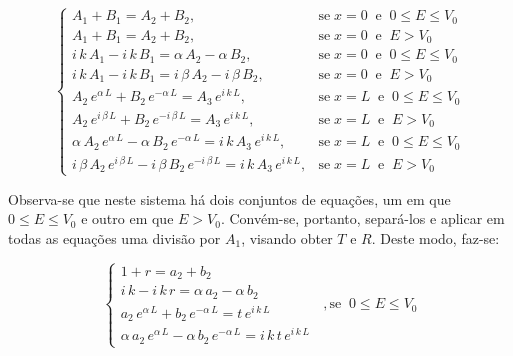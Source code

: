 \begin{equation}
	\begin{cases}
		A_1 + B_1 = A_2 + B_2 ,                                          &
		\mbox{se}\; x=0 \;\; \mbox{e} \;\; 0 \le E \le V_0                 \\

		A_1 + B_1 = A_2 + B_2 ,                                          &
		\mbox{se}\; x=0 \;\; \mbox{e} \;\; E > V_0                         \\

		i\,k\,A_1 - i\,k\,B_1 = \alpha\,A_2 - \alpha\,B_2 ,              &
		\mbox{se}\; x=0 \;\; \mbox{e} \;\; 0 \le E \le V_0                 \\

		i\,k\,A_1 - i\,k\,B_1 = i\,\beta\,A_2 - i\,\beta\,B_2 ,          &
		\mbox{se}\; x=0 \;\; \mbox{e} \;\; E > V_0                         \\

		A_2\,e^{\alpha\,L} + B_2\,e^{-\alpha\,L} = A_3\,e^{i\,k\,L} ,    &
		\mbox{se}\; x=L \;\; \mbox{e} \;\; 0 \le E \le V_0                 \\

		A_2\,e^{i\,\beta\,L} + B_2\,e^{-i\,\beta\,L} = A_3\,e^{i\,k\,L}, &
		\mbox{se}\; x=L \;\; \mbox{e} \;\; E > V_0                         \\

		\alpha\,A_2\,e^{\alpha\,L} - \alpha\,B_2\,e^{-\alpha\,L} =
		i\,k\,A_3\,e^{i\,k\,L} ,                                         &
		\mbox{se}\; x=L \;\; \mbox{e} \;\; 0 \le E \le V_0                 \\

		i\,\beta\,A_2\,e^{i\,\beta\,L} - i\,\beta\,B_2\,e^{-i\,\beta\,L} =
		i\,k\,A_3\,e^{i\,k\,L},                                          &
		\mbox{se}\; x=L \;\; \mbox{e} \;\; E > V_0
	\end{cases}
\end{equation}

\noindent Observa-se que neste sistema há dois conjuntos de equações, um em que
$0 \le E \le V_0$ e outro em que $E>V_0$. Convém-se, portanto, separá-los
e aplicar em todas as equações uma divisão por $A_1$, visando obter $T$ e $R$.
Deste modo, faz-se:

\begin{equation}
	\begin{cases}
		1 + r = a_2 + b_2                                         \\
		i\,k - i\,k\,r = \alpha\,a_2 - \alpha\,b_2                \\
		a_2\,e^{\alpha\,L} + b_2\,e^{-\alpha\,L} = t\,e^{i\,k\,L} \\
		\alpha\,a_2\,e^{\alpha\,L} - \alpha\,b_2\,e^{-\alpha\,L} =
		i\,k\,t\,e^{i\,k\,L}
	\end{cases}\;\;, \mbox{se}\;\;0 \le E \le V_0
\end{equation}

